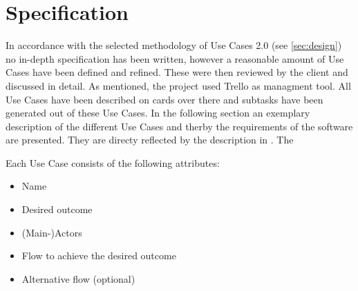 \section{Specification}
\label{sec:specification}

In accordance with the selected methodology of Use Cases 2.0 (see \autoref{sec:design}) no in-depth specification has been written, however a reasonable amount of Use Cases have been defined and refined. These were then reviewed by the client and discussed in detail. As mentioned, the project used Trello as managment tool. All Use Cases have been described on cards over there and subtasks have been generated out of these Use Cases. In the following section an exemplary description of the different Use Cases and therby the requirements of the software are presented. They are directy reflected by the description in \cite{sassoon2014,sassoon2016, sassoon2016CD}. The

Each Use Case consists of the following attributes:

\begin{itemize}
\item Name
\item Desired outcome
\item (Main-)\glspl{Actor}
\item Flow to achieve the desired outcome
\item Alternative flow (optional)
\end{itemize}

